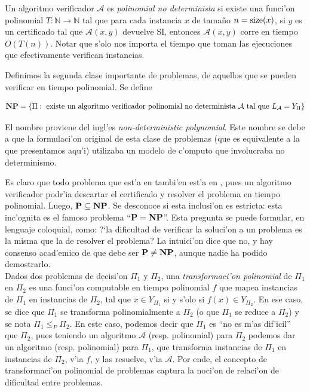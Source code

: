 Un algoritmo verificador $\mathcal{A}$ es \textit{polinomial no determinista} si existe una funci'on polinomial $T: \mathbb{N} \to \mathbb{N}$ tal que para cada instancia $x$ de tama\~no $n = \textnormal{size}(x)$, si $y$ es un certificado tal que $\mathcal{A}(x, y)$ devuelve SI, entonces $\mathcal{A}(x, y)$ corre en tiempo $O(T(n))$. Notar que s'olo nos importa el tiempo que toman las ejecuciones que efectivamente verifican instancias.

Definimos la segunda clase importante de problemas, de aquellos que se pueden verificar en tiempo polinomial. Se define

\[\textnormal{\textbf{NP}} = \{\Pi : \text{ existe un algoritmo verificador polinomial no determinista } \mathcal{A} \text{ tal que } L_{\mathcal{A}} = Y_{\Pi}\}\]

\noindent
El nombre  proviene del ingl'es \textit{non-deterministic polynomial}. Este nombre se debe a que la formulaci'on original de esta clase de problemas (que es equivalente a la que presentamos aqu'i) utilizaba un modelo de c'omputo que involucraba no determinismo.

Es claro que todo problema que est'a en  tambi'en est'a en , pues un algoritmo verificador podr'ia descartar el certificado y resolver el problema en tiempo polinomial. Luego, $\textnormal{\textbf{P}} \subseteq \textnormal{\textbf{NP}}$. Se desconoce si esta inclusi'on es estricta: esta inc'ognita es el famoso problema ``$\textnormal{\textbf{P}} = \textnormal{\textbf{NP}}$''. Esta pregunta se puede formular, en lenguaje coloquial, como: ?`la dificultad de verificar la soluci'on a un problema es la misma que la de resolver el problema? La intuici'on dice que no, y hay consenso acad'emico de que debe ser $\textnormal{\textbf{P}} \neq \textnormal{\textbf{NP}}$, aunque nadie ha podido demostrarlo.\\

Dados dos problemas de decisi'on $\Pi_1$ y $\Pi_2$, una \textit{transformaci'on polinomial} de $\Pi_1$ en $\Pi_2$ es una funci'on computable en tiempo polinomial $f$ que mapea instancias de $\Pi_1$ en instancias de $\Pi_2$, tal que $x \in Y_{\Pi_1}$ si y s'olo si $f(x) \in Y_{\Pi_2}$. En ese caso, se dice que $\Pi_1$ se transforma polinomialmente a $\Pi_2$ (o que $\Pi_1$ se reduce a $\Pi_2$) y se nota $\Pi_1 \leq_{P} \Pi_2$. En este caso, podemos decir que $\Pi_1$ es ``no es m'as dif'icil'' que $\Pi_2$, pues teniendo un algoritmo $\mathcal{A}$ (resp. polinomial) para $\Pi_2$ podemos dar un algoritmo (resp. polinomial) para $\Pi_1$, que transforma instancias de $\Pi_1$ en instancias de $\Pi_2$, v'ia $f$, y las resuelve, v'ia $\mathcal{A}$. Por ende, el concepto de transformaci'on polinomial de problemas captura la noci'on de relaci'on de dificultad entre problemas.

